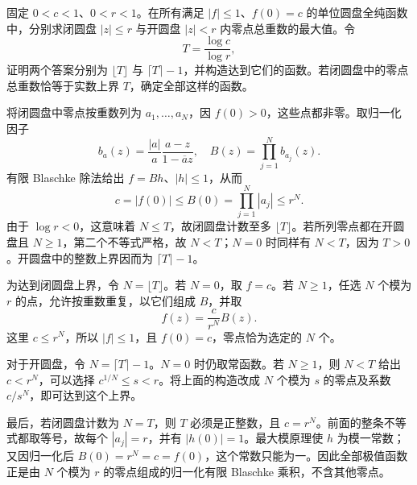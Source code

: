\begin{exercise}[最优零点计数与边界]\label{b3:ex:18-draft-02}
固定 \(0<c<1\)、\(0<r<1\)。在所有满足 \(|f|\le1\)、\(f(0)=c\) 的单位圆盘全纯函数中，分别求闭圆盘 \(|z|\le r\) 与开圆盘 \(|z|<r\) 内零点总重数的最大值。令
\[
 T=\frac{\log c}{\log r},
\]
证明两个答案分别为 \(\lfloor T\rfloor\) 与 \(\lceil T\rceil-1\)，并构造达到它们的函数。若闭圆盘中的零点总重数恰等于实数上界 \(T\)，确定全部这样的函数。
\end{exercise}
\begin{solution}
将闭圆盘中零点按重数列为 \(a_1,\ldots,a_N\)，因 \(f(0)>0\)，这些点都非零。取归一化因子
\[
 b_a(z)=\frac{|a|}{a}\frac{a-z}{1-\overline a z},\quad
 B(z)=\prod_{j=1}^Nb_{a_j}(z).
\]
有限 Blaschke 除法给出 \(f=Bh\)、\(|h|\le1\)，从而
\[
 c=|f(0)|\le B(0)=\prod_{j=1}^N|a_j|\le r^N.
\]
由于 \(\log r<0\)，这意味着 \(N\le T\)，故闭圆盘计数至多 \(\lfloor T\rfloor\)。若所列零点都在开圆盘且 \(N\ge1\)，第二个不等式严格，故 \(N<T\)；\(N=0\) 时同样有 \(N<T\)，因为 \(T>0\)。开圆盘中的整数上界因而为 \(\lceil T\rceil-1\)。

为达到闭圆盘上界，令 \(N=\lfloor T\rfloor\)。若 \(N=0\)，取 \(f=c\)。若 \(N\ge1\)，任选 \(N\) 个模为 \(r\) 的点，允许按重数重复，以它们组成 \(B\)，并取
\[
 f(z)=\frac{c}{r^N}B(z).
\]
这里 \(c\le r^N\)，所以 \(|f|\le1\)，且 \(f(0)=c\)，零点恰为选定的 \(N\) 个。

对于开圆盘，令 \(N=\lceil T\rceil-1\)。\(N=0\) 时仍取常函数。若 \(N\ge1\)，则 \(N<T\) 给出 \(c<r^N\)，可以选择 \(c^{1/N}\le s<r\)。将上面的构造改成 \(N\) 个模为 \(s\) 的零点及系数 \(c/s^N\)，即可达到这个上界。

最后，若闭圆盘计数为 \(N=T\)，则 \(T\) 必须是正整数，且 \(c=r^N\)。前面的整条不等式都取等号，故每个 \(|a_j|=r\)，并有 \(|h(0)|=1\)。最大模原理使 \(h\) 为模一常数；又因归一化后 \(B(0)=r^N=c=f(0)\)，这个常数只能为一。因此全部极值函数正是由 \(N\) 个模为 \(r\) 的零点组成的归一化有限 Blaschke 乘积，不含其他零点。
\end{solution}

